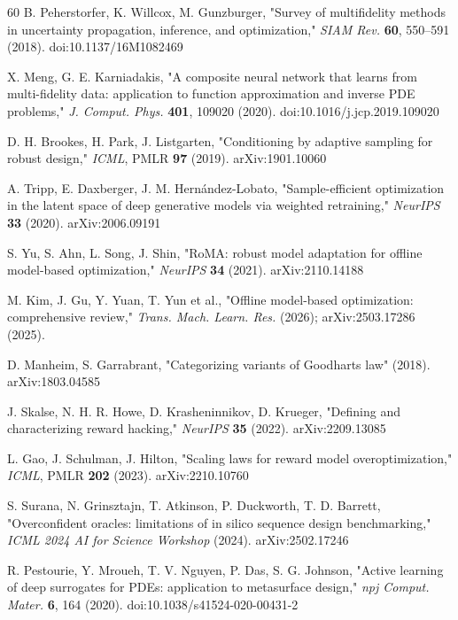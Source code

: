 \documentclass[11pt,a4paper]{article}
\begin{document}
\begin{thebibliography}{60}
B. Peherstorfer, K. Willcox, M. Gunzburger, "Survey of multifidelity methods in uncertainty propagation, inference, and optimization," \emph{SIAM Rev.} \textbf{60}, 550--591 (2018). doi:10.1137/16M1082469

X. Meng, G. E. Karniadakis, "A composite neural network that learns from multi-fidelity data: application to function approximation and inverse PDE problems," \emph{J. Comput. Phys.} \textbf{401}, 109020 (2020). doi:10.1016/j.jcp.2019.109020

D. H. Brookes, H. Park, J. Listgarten, "Conditioning by adaptive sampling for robust design," \emph{ICML}, PMLR \textbf{97} (2019). arXiv:1901.10060

A. Tripp, E. Daxberger, J. M. Hern\'andez-Lobato, "Sample-efficient optimization in the latent space of deep generative models via weighted retraining," \emph{NeurIPS} \textbf{33} (2020). arXiv:2006.09191

S. Yu, S. Ahn, L. Song, J. Shin, "RoMA: robust model adaptation for offline model-based optimization," \emph{NeurIPS} \textbf{34} (2021). arXiv:2110.14188

M. Kim, J. Gu, Y. Yuan, T. Yun et al., "Offline model-based optimization: comprehensive review," \emph{Trans. Mach. Learn. Res.} (2026); arXiv:2503.17286 (2025).

D. Manheim, S. Garrabrant, "Categorizing variants of Goodhart\textquotesingle s law" (2018). arXiv:1803.04585

J. Skalse, N. H. R. Howe, D. Krasheninnikov, D. Krueger, "Defining and characterizing reward hacking," \emph{NeurIPS} \textbf{35} (2022). arXiv:2209.13085

L. Gao, J. Schulman, J. Hilton, "Scaling laws for reward model overoptimization," \emph{ICML}, PMLR \textbf{202} (2023). arXiv:2210.10760

S. Surana, N. Grinsztajn, T. Atkinson, P. Duckworth, T. D. Barrett, "Overconfident oracles: limitations of in silico sequence design benchmarking," \emph{ICML 2024 AI for Science Workshop} (2024). arXiv:2502.17246

R. Pestourie, Y. Mroueh, T. V. Nguyen, P. Das, S. G. Johnson, "Active learning of deep surrogates for PDEs: application to metasurface design," \emph{npj Comput. Mater.} \textbf{6}, 164 (2020). doi:10.1038/s41524-020-00431-2


\end{thebibliography}
\end{document}
